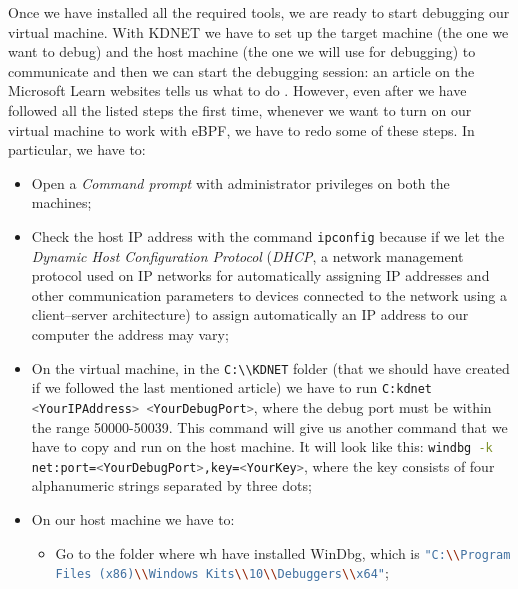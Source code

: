 Once we have installed all the required tools, we are ready to start debugging our virtual machine.
With KDNET we have to set up the target machine (the one we want to debug) and the host machine (the one we will use for debugging) to communicate and then we can start the debugging session: an article on the Microsoft Learn websites tells us what to do \cite{SetUpNetDebug}.
However, even after we have followed all the listed steps the first time, whenever we want to turn on our virtual machine to work with eBPF, we have to redo some of these steps.
In particular, we have to:

\begin{itemize}
	\item 
		Open a \textit{Command prompt} with administrator privileges on both the machines;
	\item 
		Check the host IP address with the command \colorbox{backcolour}{\lstinline[style=commandline, language=bash]|ipconfig|} because if we let the \textit{Dynamic Host Configuration Protocol} (\textit{DHCP}, a network management protocol used on IP networks for automatically assigning IP addresses and other communication parameters to devices connected to the network using a client–server architecture) to assign automatically an IP address to our computer the address may vary;
	\item 
		On the virtual machine, in the \colorbox{backcolour}{\lstinline[style=commandline, language=bash]|C:\\KDNET|} folder (that we should have created if we followed the last mentioned article) we have to run \colorbox{backcolour}{\lstinline[style=commandline, language=bash]|C:kdnet <YourIPAddress> <YourDebugPort>|}, where the debug port must be within the range 50000-50039.
		This command will give us another command that we have to copy and run on the host machine.
		It will look like this: \colorbox{backcolour}{\lstinline[style=commandline, language=bash]|windbg -k net:port=<YourDebugPort>,key=<YourKey>|}, where the key consists of four alphanumeric strings separated by three dots;
	\item 
		On our host machine we have to:
		\begin{itemize}
			\item 
				Go to the folder where wh have installed WinDbg, which is \colorbox{backcolour}{\lstinline[style=commandline, language=bash]|"C:\\Program Files (x86)\\Windows Kits\\10\\Debuggers\\x64"|};

\end{itemize}
\end{itemize}
